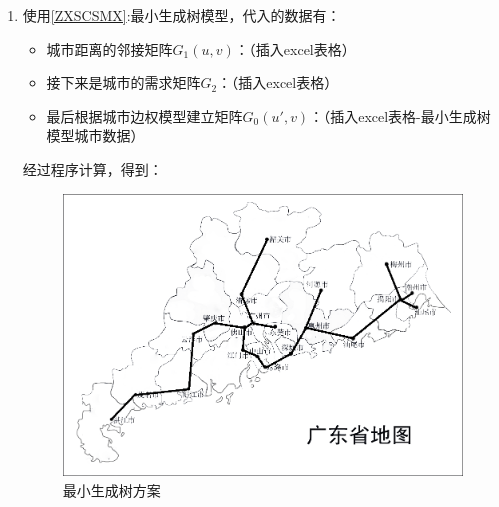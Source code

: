 \documentclass[UTF8,12pt]{ctexart}
\begin{document}
\begin{enumerate}
                \item 使用\ref{ZXSCSMX}:最小生成树模型，代入的数据有：
                    \begin{itemize}
                        \item 城市距离的邻接矩阵$G_1(u,v)$：（插入excel表格）
                        \item 接下来是城市的需求矩阵$G_2$：（插入excel表格）
                        \item 最后根据城市边权模型建立矩阵$G_{0}(u',v)$：（插入excel表格-最小生成树模型城市数据）
                    \end{itemize}
                经过程序计算，得到：
                    \begin{figure}[H]
                      \centering
                      \includegraphics[scale=0.6]{ZXSCS.png}   %
                      \caption{最小生成树方案}
                      \end{figure} 
            \end{enumerate}
\end{document}
